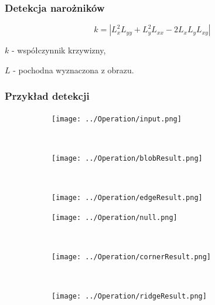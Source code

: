 \begin{frame}
	\frametitle{Detekcja narożników}



	$$ k = |L_x^2L_{yy}  + L_y^2L_{xx} - 2L_xL_yL_{xy}| $$

	$ k $ - współczynnik krzywizny,

	$ L $ - pochodna wyznaczona z obrazu.



\end{frame}
\begin{frame}
	\frametitle{Przykład detekcji}

	\begin{figure}[h]
		\begin{center}

			\begin{subfigure}[b]{3cm}
				\centering
				\texttt{[image: ../Operation/input.png]}
			\end{subfigure}~
			\begin{subfigure}[b]{3cm}
				\centering
				\texttt{[image: ../Operation/blobResult.png]}
			\end{subfigure}~
			\begin{subfigure}[b]{3cm}
				\centering
				\texttt{[image: ../Operation/edgeResult.png]}
			\end{subfigure}

			\begin{subfigure}[b]{3cm}
				\centering
				\texttt{[image: ../Operation/null.png]}
			\end{subfigure}~
			\begin{subfigure}[b]{3cm}
				\centering
				\texttt{[image: ../Operation/cornerResult.png]}
			\end{subfigure}~
			\begin{subfigure}[b]{3cm}
				\centering
				\texttt{[image: ../Operation/ridgeResult.png]}
			\end{subfigure}
			\label{fig:wynik}
		\end{center}
	\end{figure}

\end{frame}

